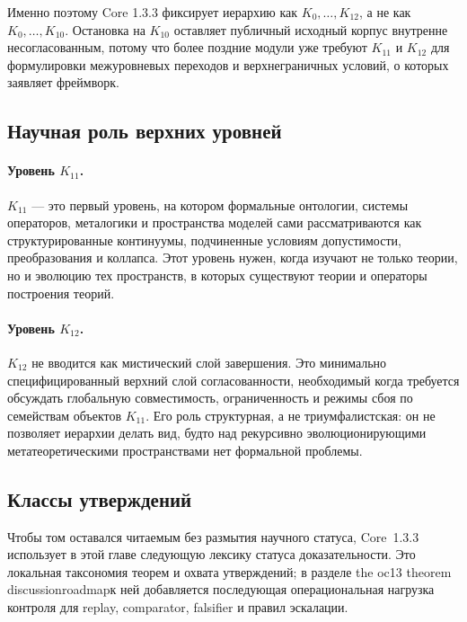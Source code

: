 Именно поэтому Core 1.3.3 фиксирует иерархию как \(K_0,\dots,K_{12}\), а не
как \(K_0,\dots,K_{10}\). Остановка на \(K_{10}\) оставляет публичный
исходный корпус внутренне несогласованным, потому что более поздние модули уже
требуют \(K_{11}\) и \(K_{12}\) для формулировки межуровневых переходов и
верхнеграничных условий, о которых заявляет фреймворк.

\subsection{Научная роль верхних уровней}

\paragraph{Уровень \texorpdfstring{$K_{11}$}{K11}.}
\(K_{11}\) — это первый уровень, на котором формальные онтологии, системы
операторов, металогики и пространства моделей сами рассматриваются как
структурированные континуумы, подчиненные условиям допустимости,
преобразования и коллапса.
Этот уровень нужен, когда изучают не только теории, но и эволюцию тех
пространств, в которых существуют теории и операторы построения теорий.

\paragraph{Уровень \texorpdfstring{$K_{12}$}{K12}.}
\(K_{12}\) не вводится как мистический слой завершения.
Это минимально специфицированный верхний слой согласованности, необходимый
когда требуется обсуждать глобальную совместимость, ограниченность и режимы
сбоя по семействам объектов \(K_{11}\).
Его роль структурная, а не триумфалистская: он не позволяет иерархии
делать вид, будто над рекурсивно эволюционирующими метатеоретическими
пространствами нет формальной проблемы.

\subsection{Классы утверждений}

Чтобы том оставался читаемым без размытия научного статуса, Core~1.3.3 использует
в этой главе следующую лексику статуса доказательности. Это локальная
таксономия теорем и охвата утверждений; в разделе
the oc13 theorem discussionroadmapк ней добавляется последующая
операциональная нагрузка контроля для replay, comparator, falsifier и
правил эскалации.

